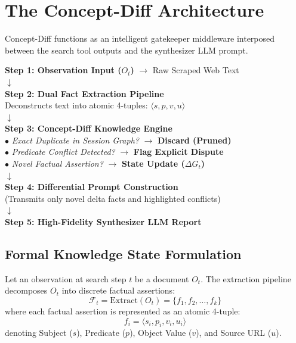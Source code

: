 \documentclass[10pt,twocolumn,letterpaper]{article}
\begin{document}
\section{The Concept-Diff Architecture}

Concept-Diff functions as an intelligent gatekeeper middleware interposed between the search tool outputs and the synthesizer LLM prompt.

\begin{tcolorbox}[colback=blue!5,colframe=blue!60,title=\textbf{Concept-Diff Differential Architecture (Ours)},fonttitle=\small\bfseries]
\small
\textbf{Step 1: Observation Input ($O_t$)} $\rightarrow$ Raw Scraped Web Text \\
$\downarrow$ \\
\textbf{Step 2: Dual Fact Extraction Pipeline} \\
Deconstructs text into atomic 4-tuples: $\langle s, p, v, u \rangle$ \\
$\downarrow$ \\
\textbf{Step 3: Concept-Diff Knowledge Engine} \\
$\bullet$ \textit{Exact Duplicate in Session Graph?} $\rightarrow$ \textbf{Discard (Pruned)} \\
$\bullet$ \textit{Predicate Conflict Detected?} $\rightarrow$ \textbf{Flag Explicit Dispute} \\
$\bullet$ \textit{Novel Factual Assertion?} $\rightarrow$ \textbf{State Update ($\Delta G_t$)} \\
$\downarrow$ \\
\textbf{Step 4: Differential Prompt Construction} \\
(Transmits only novel delta facts and highlighted conflicts) \\
$\downarrow$ \\
\textbf{Step 5: High-Fidelity Synthesizer LLM Report}
\end{tcolorbox}

\subsection{Formal Knowledge State Formulation}
Let an observation at search step $t$ be a document $O_t$. The extraction pipeline decomposes $O_t$ into discrete factual assertions:
\begin{equation}
\mathcal{F}_t = \text{Extract}(O_t) = \{ f_1, f_2, \dots, f_k \}
\end{equation}
where each factual assertion is represented as an atomic 4-tuple:
\begin{equation}
f_i = \langle s_i, p_i, v_i, u_i \rangle
\end{equation}
denoting Subject ($s$), Predicate ($p$), Object Value ($v$), and Source URL ($u$).
\end{document}
